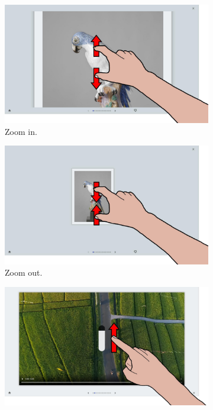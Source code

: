 \begin{figure}[ht]
    \begin{subfigure}{.24\textwidth}
        \centering
        \includegraphics[width=.97\linewidth]{Figures/LUI/Gestures/pinch_out.pdf}
        \vspace{-6pt}
        \captionsetup{width=.9\linewidth}
        \caption{Zoom in.}
        \label{fig:lui:gestures:zoom-in}
    \end{subfigure}
    \begin{subfigure}{.24\textwidth}
        \centering
        \includegraphics[width=.97\linewidth]{Figures/LUI/Gestures/pinch_in.pdf} 
        \vspace{-6pt}
        \captionsetup{width=.9\linewidth}
        \caption{Zoom out.}
        \label{fig:lui:gestures:zoom-out}
    \end{subfigure}
    \begin{subfigure}{.24\textwidth}
        \centering
        \includegraphics[width=.97\linewidth]{Figures/LUI/Gestures/swipe_up-volume.pdf}  

\end{subfigure}
\end{figure}
